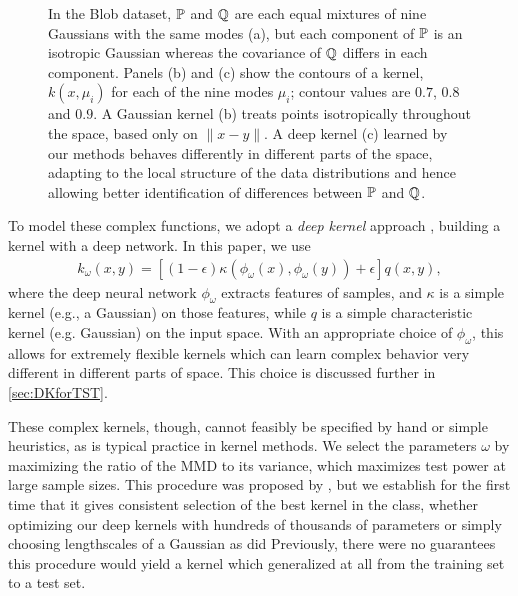 \documentclass{article}
\begin{document}
\begin{figure*}[tp]
    \begin{center}
        \vspace{-0.3cm}
        \caption{In the Blob dataset,
        $\P$ and $\Q$ are each equal mixtures of nine Gaussians with the same modes (a),
        but each component of $\P$ is an isotropic Gaussian
        whereas the covariance of $\Q$ differs in each component.
        Panels (b) and (c) show the contours of a kernel,
        $k(x, \mu_i)$ for each of the nine modes $\mu_i$;
        contour values are $0.7$, $0.8$ and $0.9$.
A Gaussian kernel (b) treats points isotropically throughout the space, based only on $\lVert x - y \rVert$.
        A deep kernel (c) learned by our methods behaves differently in different parts of the space, adapting to the local structure of the data distributions and hence allowing better identification of differences between $\P$ and $\Q$.}
        \label{fig:moti}
    \end{center}
    \vspace{-1em}
\end{figure*}

To model these complex functions,
we adopt a \emph{deep kernel} approach \citep{wilson:deep-kernel-learning,sutherland:mmd-opt,Li2017,Jean2018,Kevin_ICML2019},
building a kernel with a deep network.
In this paper, we use
\begin{align}
\label{eq:deepkernel_simpleForm}
    k_\omega(x,y) = [(1-\epsilon)\kappa(\phi_\omega(x),\phi_\omega(y))+\epsilon]q(x,y),
\end{align}
where the deep neural network $\phi_\omega$ extracts features of samples,
and $\kappa$ is a simple kernel (e.g., a Gaussian) on those features,
while $q$ is a simple characteristic kernel (e.g. Gaussian) on the input space.
With an appropriate choice of $\phi_\omega$,
this allows for extremely flexible kernels
which can learn complex behavior very different in different parts of space.
This choice is discussed further in \cref{sec:DKforTST}.

These complex kernels, though, cannot feasibly be specified by hand or simple heuristics, as is typical practice in kernel methods.
We select the parameters $\omega$
by maximizing the ratio of the MMD to its variance,
which maximizes test power at large sample sizes.
This procedure was proposed by \citet{sutherland:mmd-opt},
but we establish for the first time that it gives consistent selection of the best kernel in the class,
whether optimizing our deep kernels with hundreds of thousands of parameters
or simply choosing lengthscales of a Gaussian as did \citeauthor{sutherland:mmd-opt}
Previously, there were no guarantees this procedure would yield a kernel
which generalized at all from the training set to a test set.
\end{document}
